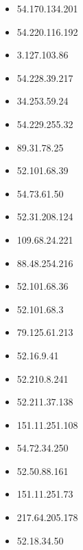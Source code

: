 \documentclass{article}
\begin{document}
\begin{itemize}
        \item 54.170.134.201
    
        \item 54.220.116.192
    
        \item 3.127.103.86
    
        \item 54.228.39.217
    
        \item 34.253.59.24
    
        \item 54.229.255.32
    
        \item 89.31.78.25
    
        \item 52.101.68.39
    
        \item 54.73.61.50
    
        \item 52.31.208.124
    
        \item 109.68.24.221
    
        \item 88.48.254.216
    
        \item 52.101.68.36
    
        \item 52.101.68.3
    
        \item 79.125.61.213
    
        \item 52.16.9.41
    
        \item 52.210.8.241
    
        \item 52.211.37.138
    
        \item 151.11.251.108
    
        \item 54.72.34.250
    
        \item 52.50.88.161
    
        \item 151.11.251.73
    
        \item 217.64.205.178
    
        \item 52.18.34.50
    

\end{itemize}
\end{document}
